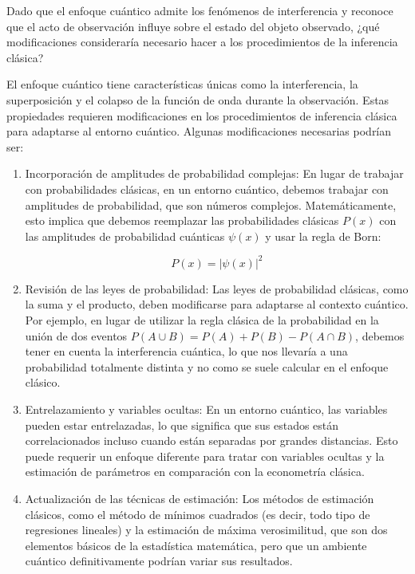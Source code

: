\begin{problema}
    Dado que el enfoque cuántico admite los fenómenos de interferencia y reconoce que el acto de observación influye sobre el estado del objeto observado, ¿qué modificaciones consideraría necesario hacer a los procedimientos de la inferencia clásica?
    \begin{sol}
        El enfoque cuántico tiene características únicas como la interferencia, la superposición y el colapso de la función de onda durante la observación. Estas propiedades requieren modificaciones en los procedimientos de inferencia clásica para adaptarse al entorno cuántico. Algunas modificaciones necesarias podrían ser: 

        \begin{enumerate}
            \item Incorporación de amplitudes de probabilidad complejas: En lugar de trabajar con probabilidades clásicas, en un entorno cuántico, debemos trabajar con amplitudes de probabilidad, que son números complejos. Matemáticamente, esto implica que debemos reemplazar las probabilidades clásicas $P(x)$ con las amplitudes de probabilidad cuánticas $\psi(x)$ y usar la regla de Born:

            $$
            P(x) = |\psi(x)|^2
            $$
            
            \item Revisión de las leyes de probabilidad: Las leyes de probabilidad clásicas, como la suma y el producto, deben modificarse para adaptarse al contexto cuántico. Por ejemplo, en lugar de utilizar la regla clásica de la probabilidad en la unión de dos eventos $P(A \cup B) = P(A) + P(B) - P(A \cap B)$, debemos tener en cuenta la interferencia cuántica, lo que nos llevaría a una probabilidad totalmente distinta y no como se suele calcular en el enfoque clásico. 
            
            \item Entrelazamiento y variables ocultas: En un entorno cuántico, las variables pueden estar entrelazadas, lo que significa que sus estados están correlacionados incluso cuando están separadas por grandes distancias. Esto puede requerir un enfoque diferente para tratar con variables ocultas y la estimación de parámetros en comparación con la econometría clásica.
            
            \item Actualización de las técnicas de estimación: Los métodos de estimación clásicos, como el método de mínimos cuadrados (es decir, todo tipo de regresiones lineales) y la estimación de máxima verosimilitud, que son dos elementos básicos de la estadística matemática, pero que un ambiente cuántico definitivamente podrían variar sus resultados. 
    

\end{enumerate}
\end{sol}
\end{problema}
